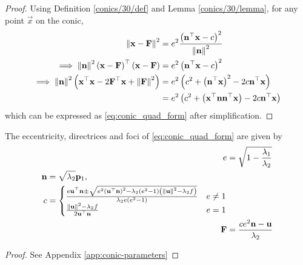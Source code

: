 \documentclass[journal,12pt,onecolumn]{IEEEtran}
\begin{document}
\begin{proof}
  Using Definition \ref{conics/30/def} and Lemma \ref{conics/30/lemma},  for any point $\vec{x}$ on the conic,
\begin{align}
\left\lVert\mathbf{x}-\mathbf{F}\right\rVert^2&=e^2 \frac{\left({\mathbf{n}^{\top}\mathbf{x} - c}\right)^2}{\left\lVert\mathbf{n}\right\rVert^2}\label{conics/30/eq:1} \\
\implies \left\lVert\mathbf{n}\right\rVert^2\left(\mathbf{x}-\mathbf{F}\right)^{\top}\left(\mathbf{x}-\mathbf{F}\right)&=e^2\left(\mathbf{n}^{\top}\mathbf{x} - c\right)^2
\\
\implies \left\lVert\mathbf{n}\right\rVert^2\left(\mathbf{x}^{\top}\mathbf{x}-2\mathbf{F}^{\top}\mathbf{x}+\left\lVert\mathbf{F}\right\rVert^2\right)&=e^2\left(c^2+\left(\mathbf{n}^{\top}\mathbf{x} \right)^2-2c\mathbf{n}^{\top}\mathbf{x}\right) \\
&=e^2\left(c^2+\left(\mathbf{x}^{\top}\mathbf{n}\mathbf{n}^{\top}\mathbf{x} \right)-2c\mathbf{n}^{\top}\mathbf{x}\right)
\end{align}
%
which can be expressed as \eqref{eq:conic_quad_form} after simplification.

\end{proof}
\begin{theorem}
  The eccentricity, directrices and foci of \eqref{eq:conic_quad_form} are given by 
\begin{align}
  \label{eq:conic_quad_form_e} 
  e&= \sqrt{1-\frac{\lambda_1}{\lambda_2}}
\\
\label{eq:conic_quad_form_nc} 
	\begin{split}
  \mathbf{n}&= \sqrt{\lambda_2}\mathbf{p}_1,  
  \\
	c &= 
  \begin{cases}
    \frac{e\mathbf{u}^{\top}\mathbf{n} \pm \sqrt{e^2\left(\mathbf{u}^{\top}\mathbf{n}\right)^2-\lambda_2\left(e^2-1\right)\left(\left\lVert\mathbf{u}\right\rVert^2 - \lambda_2 f\right)}}{\lambda_2e\left(e^2-1\right)} & e \ne 1
    \\
    \frac{\left\lVert\mathbf{u}\right\rVert^2 - \lambda_2 f   }{2\mathbf{u}^{\top}\mathbf{n}} & e = 1
  \end{cases}
	\end{split}
  \\
  \label{eq:conic_quad_form_F} 
  \mathbf{F}  &= \frac{ce^2\mathbf{n}-\mathbf{u}}{\lambda_2}
\end{align}  
\end{theorem}
\begin{proof}
	See Appendix \ref{app:conic-parameters}
\end{proof}
\end{document}
